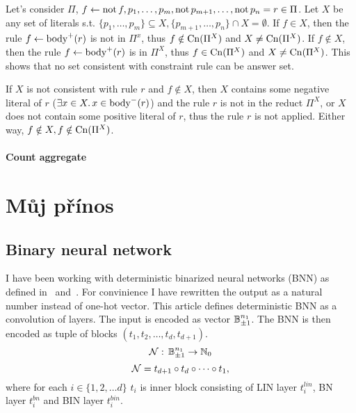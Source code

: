 \documentclass{fithesis}
\begin{document}

Let's consider $\Pi$, $f \leftarrow{} \mathrm{not}\, f, p_1, \dots, p_m,
\mathrm{not}\, p_{m+1}, \dots, \mathrm{not}\, p_n = r \in \Pi$. Let $X$ be
any set of literals s.t. $\{p_1, \dots, p_m\}\subseteq X,
\{p_{m+1}, \dots, p_n\}\cap X = \emptyset$. If $f\in X$, then the rule
$f \leftarrow{} \mathrm{body}^+(r)$ is not in $\Pi^x$, thus $f\notin \mathrm{Cn}(\Pi^X)$
and $X \neq \mathrm{Cn}(\Pi^X)$. If $f\notin X$, then the rule
$f \leftarrow{} \mathrm{body}^+(r)$ is in $\Pi^X$, thus $f\in \mathrm{Cn}(\Pi^X)$
and $X\neq \mathrm{Cn}(\Pi^X)$. This shows that no set consistent with constraint
rule can be answer set.

If $X$ is not consistent with rule $r$ and $f\notin X$,
then $X$ contains some negative literal
of $r$ ($\exists x\in X.\, x\in \mathrm{body}^-(r)$) and the rule $r$ is not in the
reduct $\Pi^X$, or $X$ does not contain some positive literal of $r$, thus the
rule $r$ is not applied. Either way, $f\notin X, f\notin \mathrm{Cn}(\Pi^X)$.

\subsubsection{Count aggregate}


\chapter{Můj přínos}

\section{Binary neural network}

I have been working with deterministic binarized neural networks (BNN)
as defined in~\cite{Hubara2016BinarizedNN} and~\cite{10.1145/3563212}.
For convinience I have rewritten the output as a natural number instead of
one-hot vector.
This article defines deterministic BNN as a convolution of layers.
The input is
encoded as vector $\mathbb{B}_{\pm 1}^{n_1}$. The BNN is then encoded as tuple of blocks
$(t_1, t_2, \dots, t_d, t_{d+1})$.
\begin{equation*}
    \mathcal{N}: \, \mathbb{B}_{\pm 1}^{n_1} \to \mathbb{N}_0
\end{equation*}
\begin{equation}
    \mathcal{N} = t_{d+1} \circ t_d \circ \dots \circ t_1,
\end{equation}
where for each $i\in \{1, 2, \dots d\}$ $t_i$ is inner block consisting
of LIN layer $t_i^{lin}$, BN layer $t_i^{bn}$ and BIN layer $t_i^{bin}$.
\end{document}
